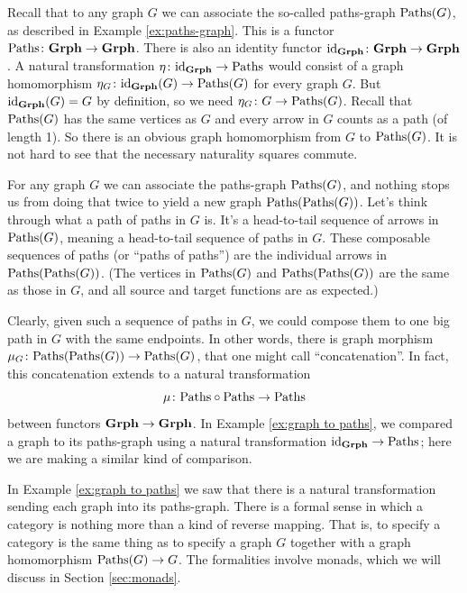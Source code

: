 \documentclass[CT4S-EN-RU]{subfiles}
\begin{document}
\begin{example}\label{ex:graph to paths}

Recall that to any graph $G$ we can associate the so-called paths-graph $\textnormal{Paths}(G)$, as described in Example \ref{ex:paths-graph}. This is a functor $\textnormal{Paths}\colon{\bf Grph}\rightarrow{\bf Grph}$. There is also an identity functor $\textnormal{id}_{{\bf Grph}}\colon{\bf Grph}\rightarrow{\bf Grph}$. A natural transformation $\eta\colon\textnormal{id}_{\bf Grph}\rightarrow\textnormal{Paths}$ would consist of a graph homomorphism $\eta_G\colon \textnormal{id}_{\bf Grph}(G)\rightarrow\textnormal{Paths}(G)$ for every graph $G$. But $\textnormal{id}_{\bf Grph}(G)=G$ by definition, so we need $\eta_G\colon G\rightarrow\textnormal{Paths}(G)$. Recall that $\textnormal{Paths}(G)$ has the same vertices as $G$ and every arrow in $G$ counts as a path (of length 1). So there is an obvious graph homomorphism from $G$ to $\textnormal{Paths}(G)$. It is not hard to see that the necessary naturality squares commute.

\end{example}

\begin{example}\label{ex:concat paths of paths}

For any graph $G$ we can associate the paths-graph $\textnormal{Paths}(G)$, and nothing stops us from doing that twice to yield a new graph $\textnormal{Paths}(\textnormal{Paths}(G))$. Let's think through what a path of paths in $G$ is. It's a head-to-tail sequence of arrows in $\textnormal{Paths}(G)$, meaning a head-to-tail sequence of paths in $G$. These composable sequences of paths (or “paths of paths”) are the individual arrows in $\textnormal{Paths}(\textnormal{Paths}(G))$. (The vertices in $\textnormal{Paths}(G)$ and $\textnormal{Paths}(\textnormal{Paths}(G))$ are the same as those in $G$, and all source and target functions are as expected.)

Clearly, given such a sequence of paths in $G$, we could compose them to one big path in $G$ with the same endpoints. In other words, there is graph morphism $\mu_G\colon\textnormal{Paths}(\textnormal{Paths}(G))\rightarrow\textnormal{Paths}(G)$, that one might call “concatenation”. In fact, this concatenation extends to a natural transformation $$\mu\colon\textnormal{Paths}\circ\textnormal{Paths}\rightarrow\textnormal{Paths}$$ between functors ${\bf Grph}\rightarrow{\bf Grph}$. In Example \ref{ex:graph to paths}, we compared a graph to its paths-graph using a natural transformation $\textnormal{id}_{{\bf Grph}}\rightarrow\textnormal{Paths}$; here we are making a similar kind of comparison.

\end{example}

\begin{remark}

In Example \ref{ex:graph to paths} we saw that there is a natural transformation sending each graph into its paths-graph. There is a formal sense in which a category is nothing more than a kind of reverse mapping. That is, to specify a category is the same thing as to specify a graph $G$ together with a graph homomorphism $\textnormal{Paths}(G)\rightarrow G$. The formalities involve monads, which we will discuss in Section \ref{sec:monads}.

\end{remark}
\end{document}
